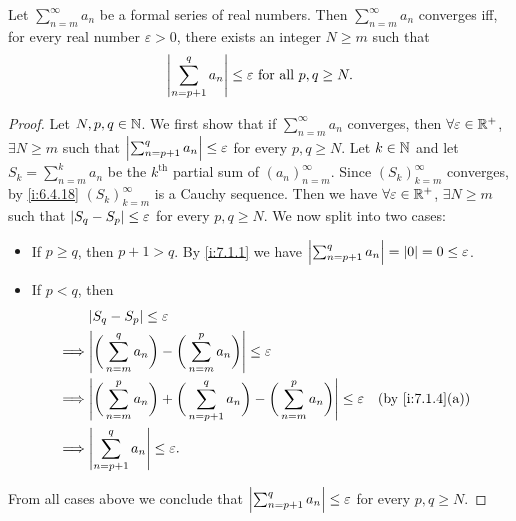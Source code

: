 \setcounter{thm}{4}
\begin{prop}\label{i:7.2.5}
  Let \(\sum_{n = m}^\infty a_n\) be a formal series of real numbers.
  Then \(\sum_{n = m}^\infty a_n\) converges iff, for every real number \(\varepsilon > 0\), there exists an integer \(N \geq m\) such that
  \[
    \left\lvert\sum_{n = p + 1}^q a_n\right\rvert \leq \varepsilon \text{ for all } p, q \geq N.
  \]
\end{prop}

\begin{proof}
  Let \(N, p, q \in \mathbb{N}\).
  We first show that if \(\sum_{n = m}^\infty a_n\) converges, then \(\forall \varepsilon \in \mathbb{R}^+\), \(\exists N \geq m\) such that \(\left\lvert\sum_{n = p + 1}^q a_n\right\rvert \leq \varepsilon\) for every \(p, q \geq N\).
  Let \(k \in \mathbb{N}\) and let \(S_k = \sum_{n = m}^k a_n\) be the \(k^{\text{th}}\) partial sum of \((a_n)_{n = m}^\infty\).
  Since \((S_k)_{k = m}^\infty\) converges, by \cref{i:6.4.18} \((S_k)_{k = m}^\infty\) is a Cauchy sequence.
  Then we have \(\forall \varepsilon \in \mathbb{R}^+\), \(\exists N \geq m\) such that \(\left\lvert S_q - S_p\right\rvert \leq \varepsilon\) for every \(p, q \geq N\).
  We now split into two cases:
  \begin{itemize}
    \item If \(p \geq q\), then \(p + 1 > q\).
          By \cref{i:7.1.1} we have \(\left\lvert\sum_{n = p + 1}^q a_n\right\rvert = \left\lvert0\right\rvert = 0 \leq \varepsilon\).
    \item If \(p < q\), then
          \begin{align*}
                     & \abs{S_q - S_p} \leq \varepsilon                                                                                                                 \\
            \implies & \abs{\bigg(\sum_{n = m}^q a_n\bigg) - \bigg(\sum_{n = m}^p a_n\bigg)} \leq \varepsilon                                                           \\
            \implies & \abs{\bigg(\sum_{n = m}^p a_n\bigg) + \bigg(\sum_{n = p + 1}^q a_n\bigg) - \bigg(\sum_{n = m}^p a_n\bigg)} \leq \varepsilon &  & \by{i:7.1.4}[a] \\
            \implies & \abs{\sum_{n = p + 1}^q a_n} \leq \varepsilon.
          \end{align*}
  \end{itemize}
  From all cases above we conclude that \(\left\lvert\sum_{n = p + 1}^q a_n\right\rvert \leq \varepsilon\) for every \(p, q \geq N\).


\end{proof}
